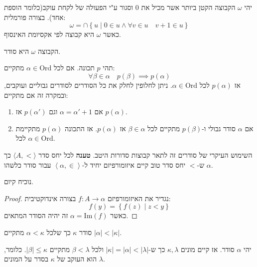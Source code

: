 \documentclass{tstextbook}
\begin{document}
\begin{definition}[אומגה]
יהי \(\omega\) הקבוצה הקטן ביותר אשר מכיל את 0 וסגור ע"י הפעולה של לקחת עוקב(כלומר הוספת אחד). בצורה פורמלית:
$$\omega=\cap \left\{  u \mid 0 \in u \land \forall v \in u\quad v+1 \in u  \right\}$$
כאשר \(\omega\) היא קבוצה לפי אקסיומת האינסוף. 

\end{definition}
\begin{proposition}
הקבוצה \(\omega\) היא סודר.  

\end{proposition}
\begin{proposition}
תהי \(p\) תכונה. אם לכל \(\alpha \in \mathrm{Ord}\) מתקיים:
$$\forall \beta \in \alpha \quad p\left( \beta \right)\implies p\left( \alpha \right)$$
אז \(p\left( \alpha \right)\) לכל \(\alpha \in \mathrm{Or d}\). ניתן לחלופין לחלק את כל הסודרים לסודרים גבוליים ועוקבים, ובמקרה זה אם מתקיים:

  \begin{enumerate}
    \item אם \(\alpha = \alpha'+1\) וגם \(p\left( \alpha' \right)\) אז \(p\left( \alpha \right)\). 


    \item אם \(\alpha\) סודר גבולי ו-\(p\left( \beta \right)\) מתקיים לכל \(\beta \in \alpha\) אז \(p\left( \alpha \right)\). 
אז התכונה \(p\left( \alpha \right)\) מתקיימת לכל \(\alpha \in \mathrm{ Or d}\).


  \end{enumerate}
\end{proposition}
השימוש העיקרי של סודרים זה לתאר קבוצות סדורות היטב.
\textbf{טענה}
לכל יחס סדר \(\langle A,< \rangle\) כך ש-\(<\) יחס סדר טוב קיים איזומורפיזם יחיד ל-\(\left\langle  \alpha,\in  \right\rangle\) עבור סודר כלשהו \(\alpha\).

נוכיח קיום.

\begin{proof}
נגדיר את האיזומורפיזם \(f:A\to\alpha\) בצורה אינדוקטיבית:
$$f(y)=\left\{  f(z)\mid z<y  \right\}$$
כאשר \(\alpha=\mathrm{Im}(f)\) זה יהיה הסודר המתאים.

\end{proof}
\begin{definition}[מונה]
סודר \(\kappa\) כך שלכל \(\alpha< \kappa\) מתקיים \(|\alpha|<|\kappa|\).

\end{definition}
\begin{proposition}
יהי \(\alpha\) סודר. אז קיים מונים \(\kappa,\lambda\) כך ש-\(|\kappa|=|\alpha|<|\lambda|\) ולכל \(\beta<\lambda\) מתקיים \(|\beta|\leq \kappa\). כלומר, \(\lambda\) הוא העוקב של \(\kappa\) בסדר על המונים. 

\end{proposition}
\end{document}
